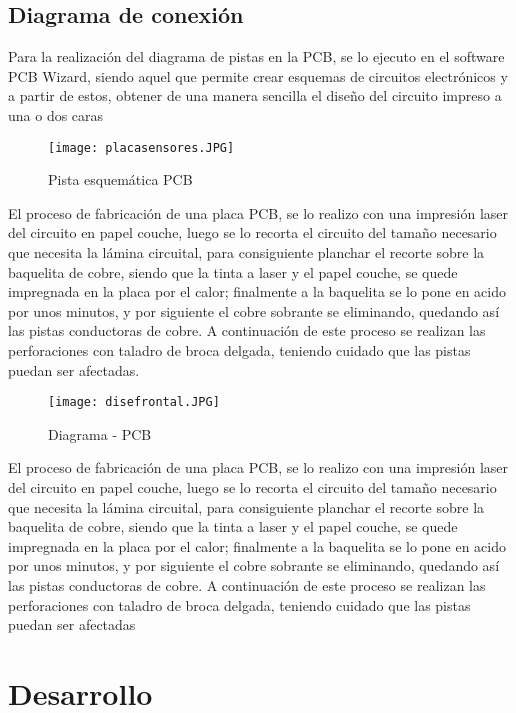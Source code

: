 \documentclass[10pt,a4paper]{article}
\begin{document}
\subsection{Diagrama de conexión }

Para la realización del diagrama de pistas en la PCB, se lo ejecuto en el software PCB Wizard, siendo aquel que permite crear esquemas de circuitos electrónicos y a partir de estos, obtener de una manera sencilla el diseño del circuito impreso a una o dos caras

\begin{figure}[H]
\centering
 \texttt{[image: placasensores.JPG]} 
\caption{Pista esquemática PCB} 
\end{figure}

El proceso de fabricación de una placa PCB, se lo realizo con una impresión laser del circuito en papel couche, luego se lo recorta el circuito del tamaño necesario que necesita la lámina circuital, para consiguiente planchar el recorte sobre la baquelita de cobre, siendo que la tinta a laser y el papel couche, se quede impregnada en la placa por el calor; finalmente a la baquelita se lo pone en acido por unos minutos, y por siguiente el cobre sobrante se eliminando, quedando así las pistas conductoras de cobre. 
A continuación de este proceso se realizan las perforaciones con taladro de broca delgada, teniendo cuidado que las pistas puedan ser afectadas.\\

\begin{figure}[H]
\centering
 \texttt{[image: disefrontal.JPG]} 
\caption{Diagrama - PCB} 
\end{figure}

El proceso de fabricación de una placa PCB, se lo realizo con una impresión laser del circuito en papel couche, luego se lo recorta el circuito del tamaño necesario que necesita la lámina circuital, para consiguiente planchar el recorte sobre la baquelita de cobre, siendo que la tinta a laser y el papel couche, se quede impregnada en la placa por el calor; finalmente a la baquelita se lo pone en acido por unos minutos, y por siguiente el cobre sobrante se eliminando, quedando así las pistas conductoras de cobre. 
A continuación de este proceso se realizan las perforaciones con taladro de broca delgada, teniendo cuidado que las pistas puedan ser afectadas\\


\section{Desarrollo}
\end{document}
